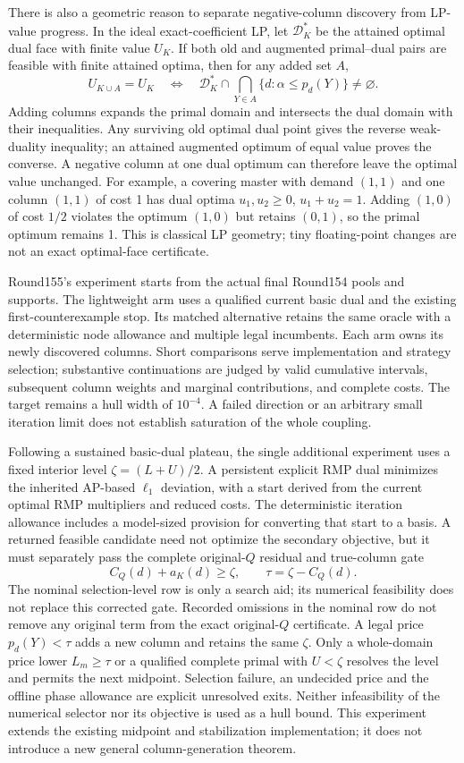 There is also a geometric reason to separate negative-column discovery
from LP-value progress. In the ideal exact-coefficient LP, let
$\mathcal D_K^*$ be the attained optimal dual face with finite value
$U_K$. If both old and augmented primal--dual pairs are feasible with
finite attained optima, then for any added set $A$,
\[
 U_{K\cup A}=U_K\quad\Longleftrightarrow\quad
 \mathcal D_K^*\cap\bigcap_{Y\in A}
 \{d:\alpha\le p_d(Y)\}\ne\varnothing.
\]
Adding columns expands the primal domain and intersects the dual domain
with their inequalities. Any surviving old optimal dual point gives the
reverse weak-duality inequality; an attained augmented optimum of equal
value proves the converse. A negative column at one dual optimum can
therefore leave the optimal value unchanged. For example, a covering
master with demand $(1,1)$ and one column $(1,1)$ of cost 1 has dual
optima $u_1,u_2\ge0$, $u_1+u_2=1$. Adding $(1,0)$ of cost $1/2$ violates
the optimum $(1,0)$ but retains $(0,1)$, so the primal optimum remains 1.
This is classical LP geometry; tiny floating-point changes are not an
exact optimal-face certificate.

Round155's experiment starts from the actual final Round154 pools and
supports. The lightweight arm uses a qualified current basic dual and
the existing first-counterexample stop. Its matched alternative retains
the same oracle with a deterministic node allowance and multiple legal
incumbents. Each arm owns its newly discovered columns. Short comparisons
serve implementation and strategy selection; substantive continuations
are judged by valid cumulative intervals, subsequent column weights and
marginal contributions, and complete costs. The target remains a hull
width of $10^{-4}$. A failed direction or an arbitrary small iteration
limit does not establish saturation of the whole coupling.

Following a sustained basic-dual plateau, the single additional experiment
uses a fixed interior level $\zeta=(L+U)/2$. A persistent explicit RMP dual
minimizes the inherited AP-based $\ell_1$ deviation, with a start derived
from the current optimal RMP multipliers and reduced costs. The deterministic
iteration allowance includes a model-sized provision for converting that
start to a basis. A returned feasible candidate need not optimize the
secondary objective, but it must separately pass the complete original-$Q$
residual and true-column gate
\[
 C_Q(d)+a_K(d)\ge\zeta,\qquad \tau=\zeta-C_Q(d).
\]
The nominal selection-level row is only a search aid; its numerical feasibility
does not replace this corrected gate. Recorded omissions in the nominal row
do not remove any original term from the exact original-$Q$ certificate.
A legal price $p_d(Y)<\tau$ adds a new column and retains
the same $\zeta$. Only a whole-domain price lower $L_m\ge\tau$ or a qualified
complete primal with $U<\zeta$ resolves the level and permits the next
midpoint. Selection failure, an undecided price and the offline phase
allowance are explicit unresolved exits. Neither infeasibility of the
numerical selector nor its objective is used as a hull bound. This experiment
extends the existing midpoint and stabilization implementation; it does not
introduce a new general column-generation theorem.

